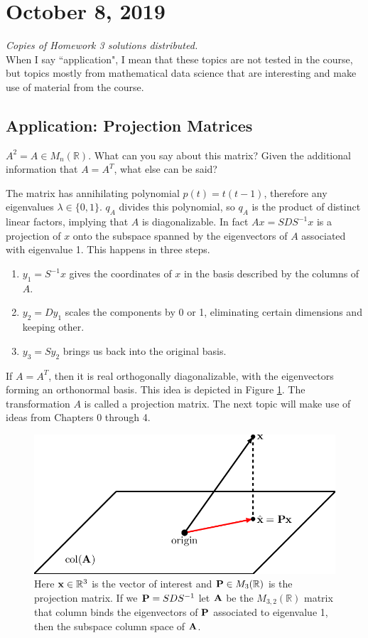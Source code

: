 \documentclass[11pt]{article}
\newcommand{\R}{\ensuremath{\mathbb R}}
\theoremstyle{plain}
\theoremstyle{definition}
\theoremstyle{remark}
\begin{document}
\section{October 8, 2019}

{\it Copies of Homework 3 solutions distributed.}\\

When I say ``application", I mean that these topics are not tested in the course, but topics mostly from mathematical data science that are interesting and make use of material from the course.

\subsection*{Application: Projection Matrices} 

$A^2 = A \in M_n(\R)$. What can you say about this matrix? Given the additional information that $A = A^T$, what else can be said?

The matrix has annihilating polynomial $p(t) = t(t-1)$, therefore any eigenvalues $\lambda \in \{0,1\}$. $q_A$ divides this polynomial, so $q_A$ is the product of distinct linear factors, implying that $A$ is diagonalizable. In fact $Ax = SDS^{-1}x$ is a projection of $x$ onto the subspace spanned by the eigenvectors of $A$ associated with eigenvalue 1. This happens in three steps.
\begin{enumerate}
    \item $y_1 = S^{-1}x$ gives the coordinates of $x$ in the basis described by the columns of $A$.
    \item $y_2 = Dy_1$ scales the components by 0 or 1, eliminating certain dimensions and keeping other.
    \item $y_3 = Sy_2$ brings us back into the original basis.
\end{enumerate}
If $A = A^T$, then it is real orthogonally diagonalizable, with the eigenvectors forming an orthonormal basis. This idea is depicted in Figure \ref{fig:proj}. The transformation $A$ is called a projection matrix. The next topic will make use of ideas from Chapters 0 through 4.

\begin{figure}[ht!]
    \centering
    \includegraphics[width=0.6\linewidth]{figures/projection.png}
    \caption{Here ${\bf x} \in \R^3$ is the vector of interest and ${\bf P} \in M_3(\R)$ is the projection matrix. If we ${\bf P} = SDS^{-1}$ let ${\bf A}$ be the $M_{3,2}(\R)$ matrix that column binds the eigenvectors of ${\bf P}$ associated to eigenvalue 1, then the subspace column space of ${\bf A}$.}
    \label{fig:proj}
\end{figure}
\end{document}
